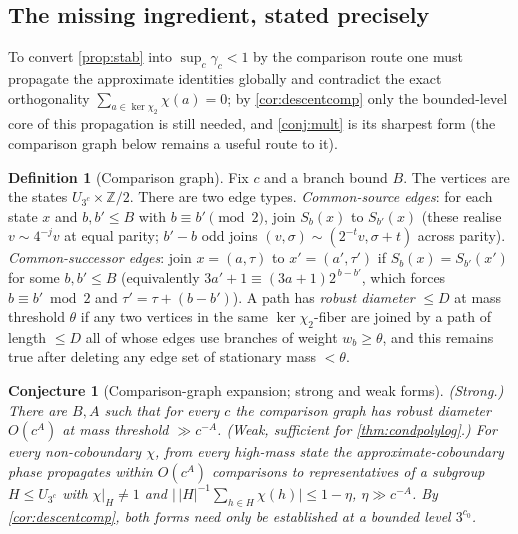 \documentclass[11pt]{article}
\newcommand{\Z}{\mathbb{Z}}
\theoremstyle{plain}
\newtheorem{conjecture}{Conjecture}
\theoremstyle{definition}
\newtheorem{definition}{Definition}
\theoremstyle{remark}
\begin{document}
\subsection*{The missing ingredient, stated precisely}

To convert \cref{prop:stab} into $\sup_c\gamma_c<1$ by the comparison route one
must propagate the approximate identities globally and contradict the exact
orthogonality $\sum_{a\in\ker\chi_2}\chi(a)=0$; by \cref{cor:descentcomp} only
the bounded-level core of this propagation is still needed, and
\cref{conj:mult} is its sharpest form (the comparison graph below remains a
useful route to it).

\begin{definition}[Comparison graph]\label{def:compgraph}
Fix $c$ and a branch bound $B$. The vertices are the states
$U_{3^c}\times\Z/2$. There are two edge types.
\emph{Common-source edges}: for each state $x$ and $b,b'\le B$ with
$b\equiv b'\pmod2$, join $S_b(x)$ to $S_{b'}(x)$ (these realise
$v\sim4^{-j}v$ at equal parity; $b'-b$ odd joins
$(v,\sigma)\sim(2^{-t}v,\sigma+t)$ across parity).
\emph{Common-successor edges}: join $x=(a,\tau)$ to $x'=(a',\tau')$ if
$S_b(x)=S_{b'}(x')$ for some $b,b'\le B$ (equivalently
$3a'+1\equiv(3a+1)2^{\,b-b'}$, which forces $b\equiv b'\bmod2$ and
$\tau'=\tau+(b-b')$). A path has \emph{robust diameter} $\le D$ at mass
threshold $\theta$ if any two vertices in the same $\ker\chi_2$-fiber are
joined by a path of length $\le D$ all of whose edges use branches of weight
$w_b\ge\theta$, and this remains true after deleting any edge set of
stationary mass $<\theta$.
\end{definition}

\begin{conjecture}[Comparison-graph expansion; strong and weak forms]\label{conj:exp}
\emph{(Strong.)} There are $B,A$ such that for every $c$ the comparison graph
has robust diameter $O(c^A)$ at mass threshold $\gg c^{-A}$.
\emph{(Weak, sufficient for \cref{thm:condpolylog}.)} For every non-coboundary
$\chi$, from every high-mass state the approximate-coboundary phase propagates
within $O(c^A)$ comparisons to representatives of a subgroup $H\le U_{3^c}$
with $\chi|_H\ne1$ and
$\bigl|\,|H|^{-1}\sum_{h\in H}\chi(h)\bigr|\le1-\eta$, $\eta\gg c^{-A}$.
By \cref{cor:descentcomp}, both forms need only be established at a bounded
level $3^{c_0}$.
\end{conjecture}
\end{document}

